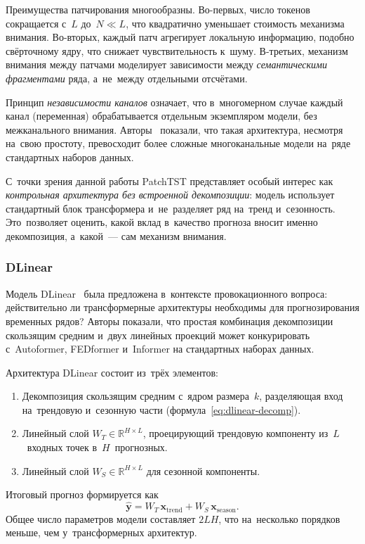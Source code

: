 Преимущества патчирования многообразны.  Во-первых, число токенов
сокращается с~$L$ до~$N \ll L$, что квадратично уменьшает стоимость
механизма внимания.  Во-вторых, каждый патч агрегирует локальную
информацию, подобно свёрточному ядру, что снижает чувствительность
к~шуму.  В-третьих, механизм внимания между патчами моделирует
зависимости между \textit{семантическими фрагментами} ряда, а~не~между
отдельными отсчётами.

Принцип \textit{независимости каналов} означает, что в~многомерном
случае каждый канал (переменная) обрабатывается отдельным экземпляром
модели, без межканального внимания.  Авторы~\cite{nie2023patchtst}
показали, что такая архитектура, несмотря на~свою простоту, превосходит
более сложные многоканальные модели на~ряде стандартных наборов данных.

С~точки зрения данной работы PatchTST представляет особый интерес как
\textit{контрольная архитектура без встроенной декомпозиции}: модель
использует стандартный блок трансформера и~не~разделяет ряд на~тренд
и~сезонность.  Это~позволяет оценить, какой вклад в~качество прогноза
вносит именно декомпозиция, а~какой~--- сам механизм внимания.


\subsubsection{DLinear}
\label{sssec:dlinear}

Модель DLinear~\cite{zeng2023transformers} была предложена в~контексте
провокационного вопроса: действительно ли трансформерные архитектуры
необходимы для прогнозирования временных рядов?  Авторы показали, что
простая комбинация декомпозиции скользящим средним и~двух линейных
проекций может конкурировать с~Autoformer, FEDformer и~Informer на
стандартных наборах данных.

Архитектура DLinear состоит из~трёх элементов:
\begin{enumerate}[nosep]
\item Декомпозиция скользящим средним с~ядром размера~$k$,
   разделяющая вход на~трендовую и~сезонную части
   (формула~\eqref{eq:dlinear-decomp}).
\item Линейный слой $W_T \in \mathbb{R}^{H \times L}$, проецирующий
   трендовую компоненту из~$L$~входных точек в~$H$~прогнозных.
\item Линейный слой $W_S \in \mathbb{R}^{H \times L}$ для сезонной
   компоненты.
\end{enumerate}
Итоговый прогноз формируется как
\begin{equation}
\label{eq:dlinear}
\hat{\mathbf{y}} = W_T\, \mathbf{x}_{\mathrm{trend}} + W_S\, \mathbf{x}_{\mathrm{season}}.
\end{equation}
Общее число параметров модели составляет $2LH$, что на~несколько
порядков меньше, чем у~трансформерных архитектур.

